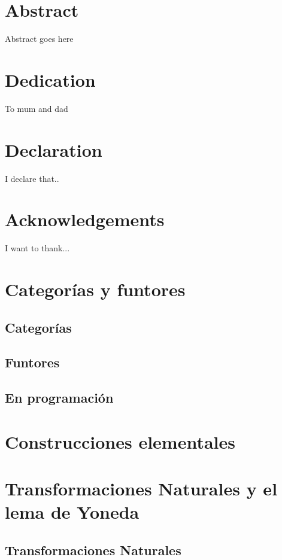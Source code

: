 \documentclass[12pt]{book}
\begin{document}
\tableofcontents

\chapter*{Abstract}
Abstract goes here

\chapter*{Dedication}
To mum and dad

\chapter*{Declaration}
I declare that..

\chapter*{Acknowledgements}
I want to thank...

\tableofcontents

\chapter{Categorías y funtores}
\section{Categorías}

\section{Funtores}

\section{En programación}


\chapter{Construcciones elementales}


\chapter{Transformaciones Naturales y el lema de Yoneda}
\section{Transformaciones Naturales}

\end{document}
